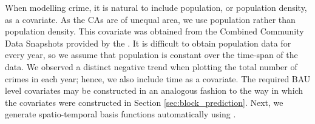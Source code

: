 \documentclass[nojss]{jss}
\newcommand{\class}[1]{`\code{#1}'}
\newcommand{\fct}[1]{\code{#1()}}
\begin{document}
When modelling crime, it is natural to include population, or population density, as a covariate. 
As the CAs are of unequal area, we use population rather than population density.
This covariate was obtained from the Combined Community Data Snapshots provided by the \cite{Chicago_community_data_snapshots}.
It is difficult to obtain population data for every year, so we assume that population is constant over the time-span of the data.
 We observed a distinct negative trend when plotting the total number of crimes in each year; hence, we also include time as a covariate.
The required BAU level covariates may be constructed in an analogous fashion to 
the way in which the covariates were constructed in 
Section \ref{sec:block_prediction}. 
%
Next, we generate spatio-temporal basis functions automatically using \fct{auto\_basis}.  
\end{document}
